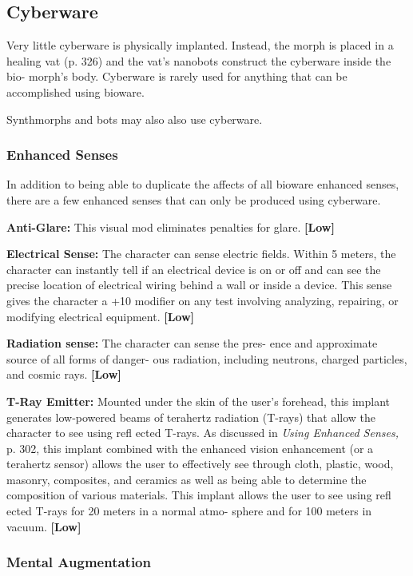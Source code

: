 \subsection{Cyberware}

Very little cyberware is physically implanted. Instead, 
the morph is placed in a healing vat (p. 326) and the 
vat's nanobots construct the cyberware inside the bio-
morph's body. Cyberware is rarely used for anything 
that can be accomplished using bioware.

Synthmorphs and bots may also also use cyberware.

\subsubsection{Enhanced Senses}

In addition to being able to duplicate the affects of all 
bioware enhanced senses, there are a few enhanced 
senses that can only be produced using cyberware.

\textbf{Anti-Glare:} This visual mod eliminates penalties for 
glare. \textbf{[Low]}

\textbf{Electrical Sense:} The character can sense electric 
fields. Within 5 meters, the character can instantly 
tell if an electrical device is on or off and can see the 
precise location of electrical wiring behind a wall or 
inside a device. This sense gives the character a +10 
modifier on any test involving analyzing, repairing, or 
modifying electrical equipment. \textbf{[Low]}

\textbf{Radiation sense:} The character can sense the pres-
ence and approximate source of all forms of danger-
ous radiation, including neutrons, charged particles, 
and cosmic rays. \textbf{[Low]}

\textbf{T-Ray Emitter:} Mounted under the skin of the 
user's forehead, this implant generates low-powered 
beams of terahertz radiation (T-rays) that allow the 
character to see using refl ected T-rays. As discussed in 
\textit{Using Enhanced Senses, }p. 302, this implant combined 
with the enhanced vision enhancement (or a terahertz 
sensor) allows the user to effectively see through cloth, 
plastic, wood, masonry, composites, and ceramics as 
well as being able to determine the composition of 
various materials. This implant allows the user to see 
using refl ected T-rays for 20 meters in a normal atmo-
sphere and for 100 meters in vacuum. \textbf{[Low]}

\subsubsection{Mental Augmentation}

